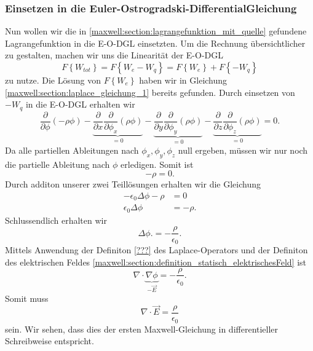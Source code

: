 \subsubsection{Einsetzen in die Euler-Ostrogradski-DifferentialGleichung}
Nun wollen wir die in \eqref{maxwell:section:lagrangefunktion_mit_quelle} gefundene Lagrangefunktion in die E-O-DGL einsetzten.
Um die Rechnung übersichtlicher zu gestalten, machen wir uns die Linearität der E-O-DGL
\begin{equation}
F\left\{W_{tot}\right\}
=
F\left\{W_e - W_q\right\}
=
F\left\{W_e\right\} + F\left\{-W_q\right\}
\label{maxwell:section:linearität_von_DGL}
\end{equation}
zu nutze.
Die Lösung von $F\left\{W_e\right\}$ haben wir in Gleichung \eqref{maxwell:section:laplace_gleichung_1} bereits gefunden.
Durch einsetzen von $-W_q$ in die E-O-DGL erhalten wir
\[
\frac{\partial}{\partial\phi}\left(-\rho\phi\right) - \underbrace{\frac{\partial}{\partial x}\frac{\partial}{\partial\phi_x}\left(\rho\phi\right)}_{=0} - \underbrace{\frac{\partial}{\partial y}\frac{\partial}{\partial\phi_y}\left(\rho\phi\right)}_{=0} - \underbrace{\frac{\partial}{\partial z}\frac{\partial}{\partial\phi_z}\left(\rho\phi\right)}_{=0}
=
0.
\]
Da alle partiellen Ableitungen nach $\phi_x, \phi_y, \phi_z$ null ergeben, müssen wir nur noch die partielle Ableitung nach $\phi$ erledigen.
Somit ist
\begin{equation}
-\rho
=
0.
\end{equation}
Durch additon unserer zwei Teillösungen erhalten wir die Gleichung
\begin{align*}
-\epsilon_0\Delta\phi - \rho
&=
0
\\
\epsilon_0\Delta\phi
&=
-\rho.
\end{align*}
Schlussendlich erhalten wir
\begin{equation}
\Delta\phi.
=
-\frac{\rho}{\epsilon_0}.
\label{maxwell:section:erste_maxwellgleichung_1}
\end{equation}
Mittels Anwendung der Definiton \ref{???} des Laplace-Operators und der Definiton des elektrischen Feldes \eqref{maxwell:section:definition_statisch_elektrischesFeld} ist
\[
\nabla\cdot\underbrace{\nabla\phi}_{-\vec{E}}
=
-\frac{\rho}{\epsilon_0}.
\]
Somit muss
\begin{equation}
\nabla\cdot\vec{E}
=
\frac{\rho}{\epsilon_0}
\label{maxwell:section:erste_maxwellgleichung_2}
\end{equation}
sein.
Wir sehen, dass dies der ersten Maxwell-Gleichung in differentieller Schreibweise entspricht.

